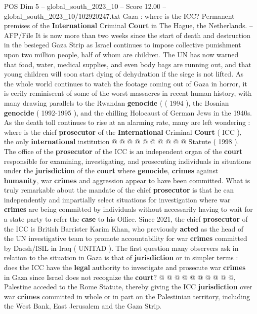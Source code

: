 \begin{textsample}{POS Dim 5 – global\_south\_2023\_10 – Score 12.00 – global\_south\_2023\_10/102920247.txt}  \label{ex:f5_pos_366}
Gaza : where is the ICC?
Permanent premises of the \textbf{International} Criminal \textbf{Court} in The Hague, the Netherlands. -- AFP/File It is now more than two weeks since the start of death and destruction in the besieged Gaza Strip as Israel continues to impose collective punishment upon two million people, half of whom are children.
The UN has now warned that food, water, medical supplies, and even body bags are running out, and that young children will soon start dying of dehydration if the siege is not lifted.
As the whole world continues to watch the footage coming out of Gaza in horror, it is eerily reminiscent of some of the worst massacres in recent human history, with many drawing parallels to the Rwandan \textbf{genocide} ( ( 1994 ), the Bosnian \textbf{genocide} ( 1992-1995 ), and the chilling Holocaust of German Jews in the 1940s.
As the death toll continues to rise at an alarming rate, many are left wondering : where is the chief \textbf{prosecutor} of the \textbf{International} Criminal \textbf{Court} ( ICC ), the only \textbf{international} institution @ @ @ @ @ @ @ @ @ @ Statute ( 1998 ).
The office of the \textbf{prosecutor} of the ICC is an independent organ of the \textbf{court} responsible for examining, investigating, and prosecuting individuals in situations under the \textbf{jurisdiction} of the \textbf{court} where \textbf{genocide}, \textbf{crimes} against \textbf{humanity}, war \textbf{crimes} and aggression appear to have been committed.
What is truly remarkable about the mandate of the chief \textbf{prosecutor} is that he can independently and impartially select situations for investigation where war \textbf{crimes} are being committed by individuals without necessarily having to wait for a state party to refer the \textbf{case} to his Office.
Since 2021, the chief \textbf{prosecutor} of the ICC is British Barrister Karim Khan, who previously \textbf{acted} as the head of the UN investigative team to promote accountability for war \textbf{crimes} committed by Daesh/ISIL in Iraq ( UNITAD ).
The first question many observers ask in relation to the situation in Gaza is that of \textbf{jurisdiction} or in simpler terms : does the ICC have the \textbf{legal} authority to investigate and prosecute war \textbf{crimes} in Gaza since Israel does not recognize the \textbf{court}? @ @ @ @ @ @ @ @ @ @, Palestine acceded to the Rome Statute, thereby giving the ICC \textbf{jurisdiction} over war \textbf{crimes} committed in whole or in part on the Palestinian territory, including the West Bank, East Jerusalem and the Gaza Strip.

\end{textsample}
